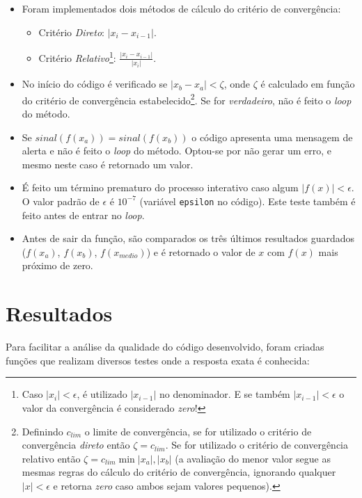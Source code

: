 \documentclass[final,3p,12pt]{elsarticle}
\begin{document}
    \begin{itemize}
        \item Foram implementados dois métodos de cálculo do critério de convergência:
        \begin{itemize}
            \item Critério \emph{Direto}: $|x_i - x_{i-1}|$.
            \item Critério \emph{Relativo}\footnote{Caso $|x_i| < \epsilon$, é utilizado $|x_{i-1}|$ no denominador. E se também $|x_{i-1}| < \epsilon$ o valor da convergência é considerado \emph{zero}!}: $\frac{|x_i - x_{i-1}|}{|x_i|}$.
        \end{itemize}
        \item No início do código é verificado se $|x_b - x_a| < \zeta$, onde $\zeta$ é calculado em função do critério de convergência estabelecido\footnote{Definindo $c_{lim}$ o limite de convergência, se for utilizado o critério de convergência \emph{direto} então $\zeta = c_{lim}$. Se for utilizado o critério de convergência relativo então $\zeta = c_{lim} \min{|x_a|,|x_b|}$ (a avaliação do menor valor segue as mesmas regras do cálculo do critério de convergência, ignorando qualquer $|x| < \epsilon$ e retorna \emph{zero} caso ambos sejam valores pequenos).}. Se for \emph{verdadeiro}, não é feito o \emph{loop} do método. 
        \item Se $sinal(f(x_a)) = sinal(f(x_b))$ o código apresenta uma mensagem de alerta e não é feito o \emph{loop} do método. Optou-se por não gerar um erro, e mesmo neste caso é retornado um valor.

        \item É feito um término prematuro do processo interativo caso algum $|f(x)| < \epsilon$. O valor padrão de $\epsilon$ é $10^{-7}$ (variável \verb|epsilon| no código). Este teste também é feito antes de entrar no \emph{loop}.
        \item Antes de sair da função, são comparados os três últimos resultados guardados ($f(x_a)$, $f(x_b)$, $f(x_{medio})$) e é retornado o valor de $x$ com $f(x)$ mais próximo de zero.
    \end{itemize}
    
    \section{Resultados}
    
    Para facilitar a análise da qualidade do código desenvolvido, foram criadas funções que realizam diversos testes onde a resposta exata é conhecida:
\end{document}
